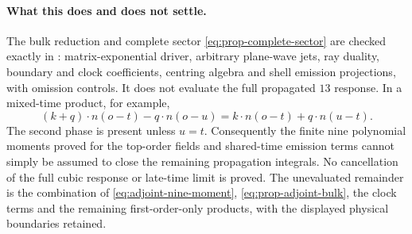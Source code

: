 \paragraph{What this does and does not settle.}
The bulk reduction and complete sector \eqref{eq:prop-complete-sector} are checked exactly
in : matrix-exponential driver, arbitrary
plane-wave jets, ray duality, boundary and clock coefficients, centring algebra and shell
emission projections, with omission controls. It does not evaluate the full propagated
$13$ response. In a mixed-time product, for example,
\[
 (k+q)\cdot n(o-t)-q\cdot n(o-u)
 =k\cdot n(o-t)+q\cdot n(u-t).
\]
The second phase is present unless $u=t$. Consequently the finite nine polynomial moments
proved for the top-order fields and shared-time emission terms cannot simply be assumed to
close the remaining propagation integrals. No cancellation of the full cubic response or
late-time limit is proved. The unevaluated remainder is the combination of
\eqref{eq:adjoint-nine-moment}, \eqref{eq:prop-adjoint-bulk}, the clock terms and the remaining
first-order-only products, with the displayed physical boundaries retained.
